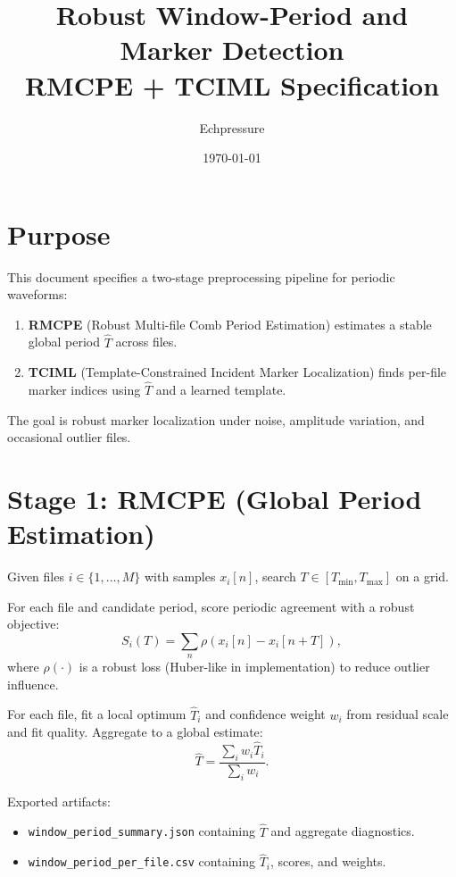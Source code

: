 \documentclass[11pt]{article}
\title{Robust Window-Period and Marker Detection\\\large RMCPE + TCIML Specification}
\author{Echpressure}
\date{\today}
\begin{document}
\maketitle

\section{Purpose}
This document specifies a two-stage preprocessing pipeline for periodic waveforms:
\begin{enumerate}
  \item \textbf{RMCPE} (Robust Multi-file Comb Period Estimation) estimates a stable global period $\hat{T}$ across files.
  \item \textbf{TCIML} (Template-Constrained Incident Marker Localization) finds per-file marker indices using $\hat{T}$ and a learned template.
\end{enumerate}
The goal is robust marker localization under noise, amplitude variation, and occasional outlier files.

\section{Stage 1: RMCPE (Global Period Estimation)}
Given files $i \in \{1,\dots,M\}$ with samples $x_i[n]$, search $T \in [T_{\min}, T_{\max}]$ on a grid.

For each file and candidate period, score periodic agreement with a robust objective:
\begin{equation}
S_i(T) = \sum_{n} \rho\!\left(x_i[n]-x_i[n+T]\right),
\end{equation}
where $\rho(\cdot)$ is a robust loss (Huber-like in implementation) to reduce outlier influence.

For each file, fit a local optimum $\hat{T}_i$ and confidence weight $w_i$ from residual scale and fit quality.
Aggregate to a global estimate:
\begin{equation}
\hat{T} = \frac{\sum_i w_i\hat{T}_i}{\sum_i w_i}.
\end{equation}

Exported artifacts:
\begin{itemize}
  \item \texttt{window\_period\_summary.json} containing $\hat{T}$ and aggregate diagnostics.
  \item \texttt{window\_period\_per\_file.csv} containing $\hat{T}_i$, scores, and weights.
\end{itemize}
\end{document}
